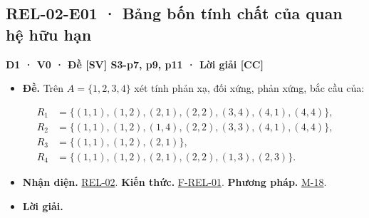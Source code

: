 \documentclass[
  10pt,
  twoside,openany]{book}
\providecommand{\tightlist}{%
  \setlength{\itemsep}{0pt}\setlength{\parskip}{0pt}}
\begin{document}
\hypertarget{REL-02-E01}{%
\subsection{REL-02-E01 · Bảng bốn tính chất của quan hệ hữu
hạn}\label{REL-02-E01}}

\textbf{D1 · V0 · Đề {[}SV{]} S3-p7, p9, p11 · Lời giải {[}CC{]}}

\begin{itemize}
\tightlist
\item
  \textbf{Đề.} Trên \(A=\{1,2,3,4\}\) xét tính phản xạ, đối xứng, phản
  xứng, bắc cầu của:
\end{itemize}

\[
\begin{aligned}
R_1&=\{(1,1),(1,2),(2,1),(2,2),(3,4),(4,1),(4,4)\},\\
R_2&=\{(1,1),(1,2),(1,4),(2,2),(3,3),(4,1),(4,4)\},\\
R_3&=\{(1,1),(1,2),(2,1)\},\\
R_4&=\{(1,1),(1,2),(2,1),(2,2),(1,3),(2,3)\}.
\end{aligned}
\]

\begin{itemize}
\tightlist
\item
  \textbf{Nhận diện.} \protect\hyperlink{REL-02}{REL-02}. \textbf{Kiến
  thức.} \protect\hyperlink{F-REL-01}{F-REL-01}. \textbf{Phương pháp.}
  \protect\hyperlink{M-18}{M-18}.
\item
  \textbf{Lời giải.}
\end{itemize}
\end{document}
